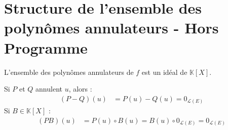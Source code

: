 \documentclass[../main.tex]{subfiles}
\begin{document}
\section{Structure de l'ensemble des polynômes annulateurs - Hors Programme}
\begin{tcolorbox}[title=Propostion 21.41 - HP, title filled=false, colframe=lightblue, colback=lightblue!10!white]
    L'ensemble des polynômes annulateurs de $f$ est un idéal de $\mathbb{K}[X]$.
\end{tcolorbox}

\noindent Si $P$ et $Q$ annulent $u$, alors : 
\begin{align*}
    (P-Q)(u) &= P(u) - Q(u) = 0_{\mathcal{L}(E)}
\end{align*}
Si $B \in \mathbb{K}[X]$ : 
\begin{align*}
    (PB)(u) &= P(u) \circ B(u) = B(u) \circ 0_{\mathcal{L}(E)} = 0_{\mathcal{L}(E)}
\end{align*}
\end{document}
